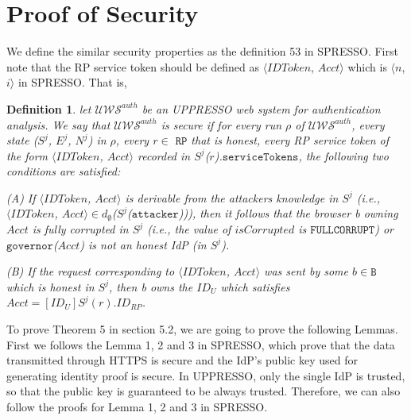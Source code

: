 \documentclass[letterpaper,onecolumn,10pt]{article}
\newtheorem{definition}{Definition}
\begin{document}
\section{Proof of Security}



We define  the similar security properties as the definition 53 in SPRESSO. 
First note that the RP service token should be defined as $\langle IDToken$, $Acct \rangle$ which is $\langle n$, $i \rangle$ in SPRESSO.
That is,  
\begin{definition}
let  $\mathcal{U\!W\!S}^{auth}$ be an UPPRESSO web system for authentication analysis. We say that $\mathcal{U\!W\!S}^{auth}$ is secure if for every run $\rho$ of $\mathcal{U\!W\!S}^{auth}$, every state ($S^j$, $E^j$, $N^j$) in $\rho$, every $r \in$ $\mathtt{RP}$ that is honest, every RP service token of the form $\langle IDToken$, $Acct \rangle$ recorded in $S^j$($r$).$\mathtt{serviceTokens}$, the following two conditions are satisfied:

(A) If $\langle IDToken$, $Acct \rangle$ is derivable from the attackers knowledge in $S^j$ (i.e., $\langle IDToken$, $Acct \rangle \in d_{\emptyset}$($S^j$($\mathtt{attacker}$))), then it follows that the browser b owning $Acct$ is fully corrupted in $S^j$ (i.e., the value of $isCorrupted$ is $\mathtt{FULLCORRUPT}$) or $\mathtt{governor}$($Acct$) is not an honest IdP (in $S^j$).

(B) If the request corresponding to $\langle IDToken$, $Acct \rangle$ was sent by some $b \in \mathtt{B}$ which is honest in $S^j$, then b owns the $ID_U$ which satisfies $Acct=[ID_U]S^j(r).ID_{RP}$.
\end{definition}

To prove Theorem 5 in section 5.2, we are going to prove the following Lemmas.
First we follows the Lemma 1, 2 and 3 in SPRESSO, which prove that the data transmitted through HTTPS is secure and the IdP's public key used for generating identity proof is secure. 
In UPPRESSO, only the single IdP is trusted, so that the public key is guaranteed to be always trusted.
Therefore, we can also follow the proofs for Lemma 1, 2 and 3 in SPRESSO.
\end{document}
